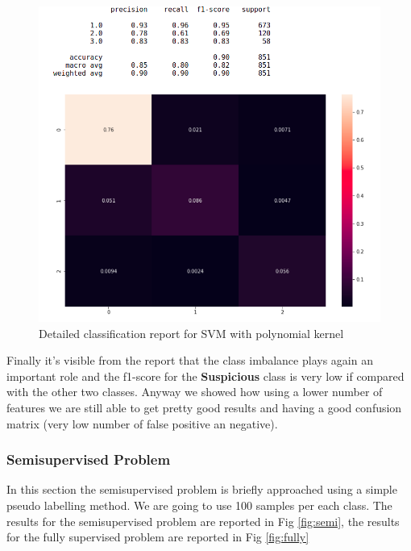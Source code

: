 \documentclass[a4paper,12pt]{article}
\begin{document}
\begin{figure}[H]
  \begin{center}
  \includegraphics[width=1.0\textwidth]{images/svm_poly.png}
  \end{center}
  \caption{Detailed classification report for SVM with polynomial kernel}
  \label{fig:poly}
\end{figure}

\noindent Finally it's visible from the report that the class imbalance plays again an important role and the f1-score for the \textbf{Suspicious} class is very low if compared with the other two classes. Anyway we showed how using a lower number of features we are still able to get pretty good results and having a good confusion matrix (very low number of false positive an negative).

\subsubsection{Semisupervised Problem}
In this section the semisupervised problem is briefly approached using a simple pseudo labelling method. We are going to use 100 samples per each class. The results for the semisupervised problem are reported in Fig \ref{fig:semi}, the results for the fully supervised problem are reported in Fig \ref{fig:fully}  
\end{document}
